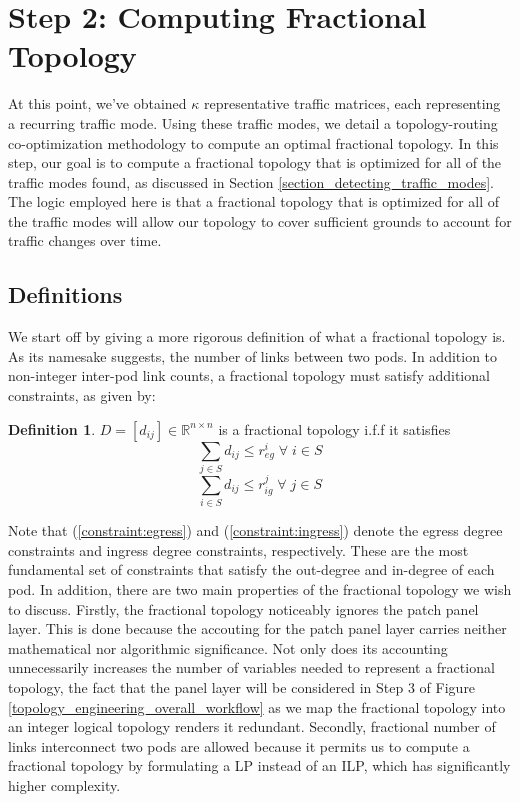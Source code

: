 \documentclass[sigconf]{acmart}
\theoremstyle{definition}
\newtheorem{definition}{Definition}[section]
\begin{document}
\section{Step 2: Computing Fractional Topology}\label{section_fractional_topology}
At this point, we've obtained $\kappa$ representative traffic matrices, each representing a recurring traffic mode. Using these traffic modes, we detail a topology-routing co-optimization methodology to compute an optimal fractional topology. In this step, our goal is to compute a fractional topology that is optimized for all of the traffic modes found, as discussed in Section \ref{section_detecting_traffic_modes}. The logic employed here is that a fractional topology that is optimized for all of the traffic modes will allow our topology to cover sufficient grounds to account for traffic changes over time. 

\subsection{Definitions}
We start off by giving a more rigorous definition of what a fractional topology is. As its namesake suggests, the number of links between two pods. In addition to non-integer inter-pod link counts, a fractional topology must satisfy additional constraints, as given by:

\begin{definition}
$D = [d_{ij}] \in \mathbb{R}^{n \times n}$ is a fractional topology i.f.f it satisfies 
\begin{equation}
\sum\limits_{j \in S} d_{ij} \leq r_{eg}^i \; \forall \; i \in S 
\label{constraint:egress}
\end{equation}
\begin{equation}
\sum\limits_{i \in S} d_{ij} \leq r_{ig}^{ j} \; \forall \; j \in S
\label{constraint:ingress}
\end{equation}
\label{defn:fractional_graph}
\end{definition}
Note that (\ref{constraint:egress}) and (\ref{constraint:ingress}) denote the egress degree constraints and ingress degree constraints, respectively. These are the most fundamental set of constraints that satisfy the out-degree and in-degree of each pod. In addition, there are two main properties of the fractional topology we wish to discuss. Firstly, the fractional topology noticeably ignores the patch panel layer. This is done because the accouting for the patch panel layer carries neither mathematical nor algorithmic significance. Not only does its accounting unnecessarily increases the number of variables needed to represent a fractional topology, the fact that the panel layer will be considered in Step 3 of Figure \ref{topology_engineering_overall_workflow} as we map the fractional topology into an integer logical topology renders it redundant. Secondly, fractional number of links interconnect two pods are allowed because it permits us to compute a fractional topology by formulating a LP instead of an ILP, which has significantly higher complexity.
\end{document}
